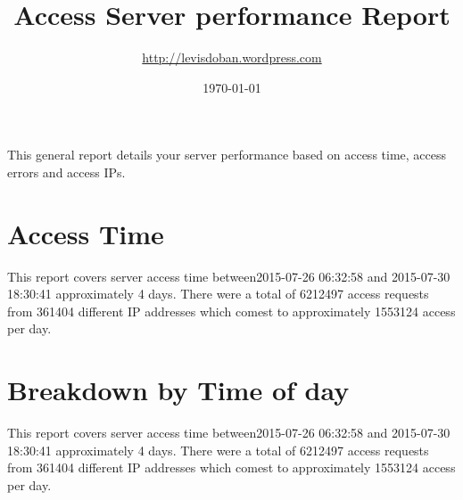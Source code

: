 \documentclass[oneside]{article}
\title{Access Server performance Report  }
\author{\url{http://levisdoban.wordpress.com}}
\date{\today}
\begin{document}
\maketitle

This general report details your server performance based on access time, access errors and access IPs. 

\tableofcontents





\pagebreak


\section{Access Time}
This report covers server access time between2015-07-26 06:32:58 and 2015-07-30 18:30:41 approximately 4 days. There were a total of 6212497 access requests from 361404 different IP addresses which comest to approximately 1553124 access per day.






\pagebreak


\pagebreak


\section{Breakdown by Time of day}

This report covers server access time between2015-07-26 06:32:58 and 2015-07-30 18:30:41 approximately 4 days. There were a total of 6212497 access requests from 361404 different IP addresses which comest to approximately 1553124 access per day.





\pagebreak
\end{document}

